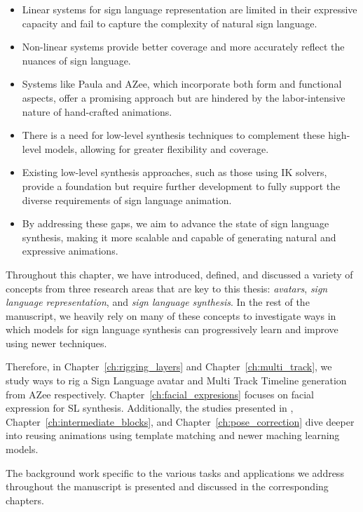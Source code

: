 \documentclass[../../main.tex]{subfiles}
\begin{document}
\begin{itemize} 
  \item Linear systems for sign language representation are limited in their expressive capacity and fail to capture the complexity of natural sign language.
  \item Non-linear systems provide better coverage and more accurately reflect the nuances of sign language.
  \item Systems like Paula and AZee, which incorporate both form and functional aspects, offer a promising approach but are hindered by the labor-intensive nature of hand-crafted animations.
  \item There is a need for low-level synthesis techniques to complement these high-level models, allowing for greater flexibility and coverage.
  \item Existing low-level synthesis approaches, such as those using IK solvers, provide a foundation but require further development to fully support the diverse requirements of sign language animation.
  \item By addressing these gaps, we aim to advance the state of sign language synthesis, making it more scalable and capable of generating natural and expressive animations.
\end{itemize}

Throughout this chapter, we have introduced, defined, and discussed a variety of concepts from three research areas that are key to this thesis: \textit{avatars}, \textit{sign language representation}, and \textit{sign language synthesis}. In the rest of the manuscript, we heavily rely on many of these concepts to investigate ways in which models for sign language synthesis can progressively learn and improve using newer techniques.

Therefore, in Chapter~\ref{ch:rigging_layers} and Chapter~\ref{ch:multi_track}, we study ways to rig a Sign Language avatar and Multi Track Timeline generation from AZee respectively. Chapter~\ref{ch:facial_expresions} focuses on facial expression for SL synthesis. Additionally, the studies presented in , Chapter~\ref{ch:intermediate_blocks}, and Chapter~\ref{ch:pose_correction} dive deeper into reusing animations using template matching and newer maching learning models.

The background work specific to the various tasks and applications we address throughout the manuscript is presented and discussed in the corresponding chapters.
\end{document}
